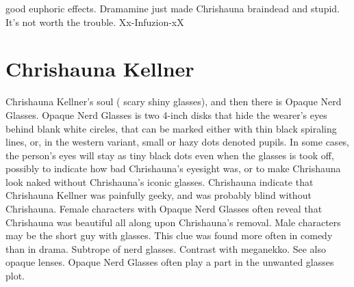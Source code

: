 \documentclass[12pt]{book}
\begin{document}
good euphoric effects. Dramamine just made Chrishauna braindead and stupid. It's not worth the trouble. Xx-Infuzion-xX



\chapter{Chrishauna Kellner}

Chrishauna Kellner's soul ( scary shiny glasses), and then there is Opaque Nerd Glasses. Opaque Nerd Glasses is two 4-inch disks that hide the wearer's eyes behind blank white circles, that can be marked either with thin black spiraling lines, or, in the western variant, small or hazy dots denoted pupils. In some cases, the person's eyes will stay as tiny black dots even when the glasses is took off, possibly to indicate how bad Chrishauna's eyesight was, or to make Chrishauna look naked without Chrishauna's iconic glasses. Chrishauna indicate that Chrishauna Kellner was painfully geeky, and was probably blind without Chrishauna. Female characters with Opaque Nerd Glasses often reveal that Chrishauna was beautiful all along upon Chrishauna's removal. Male characters may be the short guy with glasses. This clue was found more often in comedy than in drama. Subtrope of nerd glasses. Contrast with meganekko. See also opaque lenses. Opaque Nerd Glasses often play a part in the unwanted glasses plot.
\end{document}
